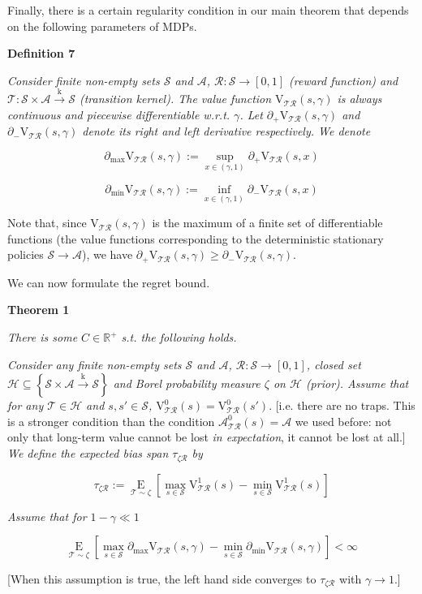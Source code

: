 \documentclass[a4paper]{article}
\newcommand{\Co}[1]{}
\newcommand{\AP}[1]{\left(#1\right)}
\newcommand{\AB}[1]{\left[#1\right]}
\newcommand{\AC}[1]{\left\{#1\right\}}
\newcommand{\Ea}[2]{\underset{#1}{\operatorname{E}}\AB{#2}}
\newcommand{\Reals}{\mathbb{R}}
\newcommand{\K}{\xrightarrow{\mathrm{k}}}
\newcommand{\St}{\mathcal{S}}
\newcommand{\A}{\mathcal{A}}
\newcommand{\R}{\mathcal{R}}
\newcommand{\T}{\mathcal{T}}
\newcommand{\Hy}{\mathcal{H}}
\newcommand{\V}{\mathrm{V}}
\begin{document}
Finally, there is a certain regularity condition in our main theorem that depends on the following parameters of MDPs.

\textbf{Definition 7}\Co{b}

\textit{Consider finite non-empty sets $\St$ and $\A$, $\R:\St\rightarrow[0,1]$ (reward function) and $\T:\St\times\A\K\St$ (transition kernel). The value function $\V_{\T\R}(s,\gamma)$ is always continuous and piecewise differentiable w.r.t. $\gamma$. Let $\partial_+\V_{\T\R}(s,\gamma)$ and $\partial_-\V_{\T\R}(s,\gamma)$ denote its right and left derivative respectively. We denote}\Co{i}

$$\partial_{\max}\V_{\T\R}(s,\gamma):=\sup_{x\in(\gamma,1)}{\partial_+\V_{\T\R}(s,x)}$$

$$\partial_{\min}\V_{\T\R}(s,\gamma):=\inf_{x\in(\gamma,1)}{\partial_-\V_{\T\R}(s,x)}$$

Note that, since $\V_{\T\R}(s,\gamma)$ is the maximum of a finite set of differentiable functions (the value functions corresponding to the deterministic stationary policies $\St\rightarrow\A$), we have $\partial_+\V_{\T\R}(s,\gamma)\geq\partial_-\V_{\T\R}(s,\gamma)$.

We can now formulate the regret bound.

\textbf{Theorem 1}\Co{b}

\textit{There is some $C\in\Reals^+$ s.t. the following holds.}\Co{i}

\textit{Consider any finite non-empty sets $\St$ and $\A$, $\R:\St\rightarrow[0,1]$, closed set $\Hy\subseteq\AC{\St\times\A\K\St}$ and Borel probability measure $\zeta$ on $\Hy$ (prior). Assume that for any $\T\in\Hy$ and $s,s'\in\St$, $\V_{\T\R}^0(s)=\V_{\T\R}^0\AP{s'}.$}\Co{i} [i.e. there are no traps. This is a stronger condition than the condition $\A^0_{\T\R}(s) = \A$ we used before: not only that long-term value cannot be lost \textit{in expectation}\Co{i}, it cannot be lost at all.] \textit{We define the expected bias span $\tau_{\zeta\R}$ by}\Co{i}

$$\tau_{\zeta\R}:=\Ea{\T\sim\zeta}{\max_{s\in\St}\V^1_{\T\R}(s)-\min_{s\in\St}\V^1_{\T\R}(s)}$$

\textit{Assume that for $1-\gamma\ll1$}\Co{i}

$$\Ea{\T\sim\zeta}{\max_{s\in\St}\partial_{\max}\V_{\T\R}(s,\gamma)-\min_{s\in\St}\partial_{\min}\V_{\T\R}(s,\gamma)}<\infty$$

[When this assumption is true, the left hand side converges to $\tau_{\zeta\R}$ with $\gamma\rightarrow1$.]
\end{document}
